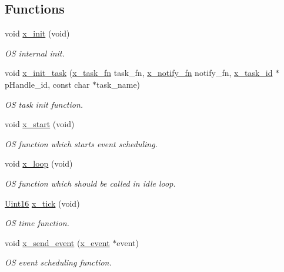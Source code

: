 \subsection*{Functions}
\begin{DoxyCompactItemize}
\item 
void \hyperlink{a00036_a05f27d3148e368ee84a448f3c4b083dd}{x\+\_\+init} (void)
\begin{DoxyCompactList}\small\item\em O\+S internal init. \end{DoxyCompactList}\item 
void \hyperlink{a00036_a1e79db5ed3ab326586129eb4d7b63d46}{x\+\_\+init\+\_\+task} (\hyperlink{a00036_ace830f248538d21bb16ea9c00997fcd7}{x\+\_\+task\+\_\+fn} task\+\_\+fn, \hyperlink{a00036_a29c1adcba84e0c3e83657c91e9b2b764}{x\+\_\+notify\+\_\+fn} notify\+\_\+fn, \hyperlink{a00036_ad5c3c5fbfd3e4aadf22830395484a71d}{x\+\_\+task\+\_\+id} $\ast$p\+Handle\+\_\+id, const char $\ast$task\+\_\+name)
\begin{DoxyCompactList}\small\item\em O\+S task init function. \end{DoxyCompactList}\item 
void \hyperlink{a00036_aea907663ecaf77bacfb9f0bfdc11f900}{x\+\_\+start} (void)
\begin{DoxyCompactList}\small\item\em O\+S function which starts event scheduling. \end{DoxyCompactList}\item 
void \hyperlink{a00036_a4bb7a012be733e061c913e7b98df642b}{x\+\_\+loop} (void)
\begin{DoxyCompactList}\small\item\em O\+S function which should be called in idle loop. \end{DoxyCompactList}\item 
\hyperlink{a00072_a59a9f6be4562c327cbfb4f7e8e18f08b}{Uint16} \hyperlink{a00036_acc618db6c04f9d2dce6d3b14b5294e51}{x\+\_\+tick} (void)
\begin{DoxyCompactList}\small\item\em O\+S time function. \end{DoxyCompactList}\item 
void \hyperlink{a00036_a4bc3d03c8d62c8237329ed4e969fbc1b}{x\+\_\+send\+\_\+event} (\hyperlink{a00036_de/d37/a00849}{x\+\_\+event} $\ast$event)
\begin{DoxyCompactList}\small\item\em O\+S event scheduling function. \end{DoxyCompactList}\item 

\end{DoxyCompactItemize}
